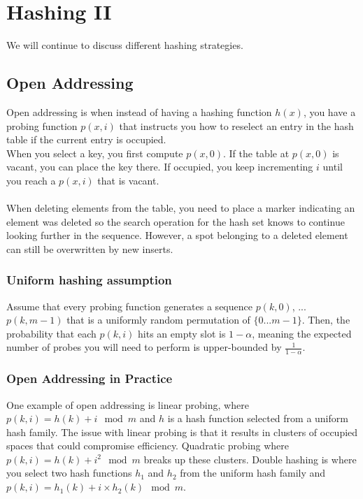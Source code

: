 \documentclass{article}
\begin{document}
\section{Hashing II}
We will continue to discuss different hashing strategies.
\subsection*{Open Addressing}
Open addressing is when instead of having a hashing function $h(x)$, you have a probing function $p(x, i)$ that instructs you how to reselect an entry in the hash table if the current entry is occupied.\\
When you select a key, you first compute $p(x, 0)$. If the table at $p(x, 0)$ is vacant, you can place the key there. If occupied, you keep incrementing $i$ until you reach a $p(x, i)$ that is vacant.\\
\\
When deleting elements from the table, you need to place a marker indicating an element was deleted so the search operation for the hash set knows to continue looking further in the sequence. However, a spot belonging to a deleted element can still be overwritten by new inserts.
\subsubsection*{Uniform hashing assumption}
Assume that every probing function generates a sequence $p(k, 0)$, ... $p(k, m-1)$ that is a uniformly random permutation of $\{0 ... m-1\}$. Then, the probability that each $p(k, i)$ hits an empty slot is $1 - \alpha$, meaning the expected number of probes you will need to perform is upper-bounded by $\frac{1}{1 - \alpha}$.
\subsubsection*{Open Addressing in Practice}
One example of open addressing is linear probing, where $p(k, i) = h(k) + i \mod m$ and $h$ is a hash function selected from a uniform hash family. The issue with linear probing is that it results in clusters of occupied spaces that could compromise efficiency. Quadratic probing where $p(k, i) = h(k) + i^2 \mod m$ breaks up these clusters. Double hashing is where you select two hash functions $h_1$ and $h_2$ from the uniform hash family and $p(k, i) = h_1(k) + i\times h_2(k) \mod m$.
\end{document}
